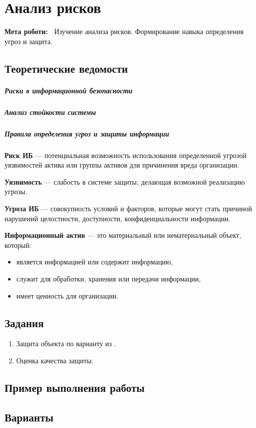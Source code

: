 \chapter{Анализ рисков} \label{chapt8}%
\textbf{Мета роботи:~}%
Изучение анализа рисков. Формирование навыка определения угроз и защита.
\section{Теоретические ведомости} \label{sect7_a}
\paragraph{Риски в информационной безопасности}

\paragraph{Анализ стойкости системы}

\paragraph{Правила определения угроз и защиты информации}


\textbf{Риск ИБ} --- потенциальная возможность использования определенной
угрозой уязвимостей актива или группы активов для причинения вреда
организации.

\textbf{Уязвимость} --- слабость в системе защиты, делающая возможной
реализацию угрозы.

\textbf{Угроза ИБ} --- совокупность условий и факторов, которые могут стать
причиной нарушений целостности, доступности, конфиденциальности информации.

\textbf{Информационный актив} --- это  материальный или нематериальный
объект, который:
\begin{itemize}
  \item является информацией или содержит информацию,
  \item служит для обработки,  хранения или передачи информации,
  \item имеет ценность для организации.
\end{itemize}






\section{Задания}\label{sect7_b}
%
\begin{enumerate}
  \item Защита объекта по варианту из .
  \item Оценка качества защиты.
\end{enumerate}
\section{Пример выполнения работы}\label{sect7_c}
%
\section{Варианты}\label{sect7_d}
%
